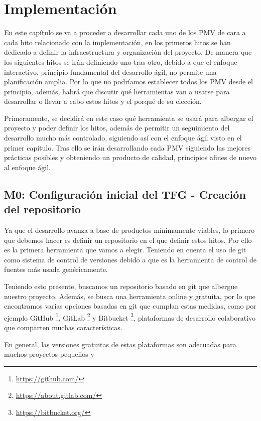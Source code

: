 \chapter{Implementación}

En este capítulo se va a proceder a desarrollar cada uno de los PMV de cara a cada hito relacionado con 
la implementación, en los primeros hitos se han dedicado a definir la infraestructura y organización del 
proyecto. De manera que los siguientes hitos se irán definiendo uno tras otro, debido a que el enfoque 
interactivo, principio fundamental del desarrollo ágil, no permite una planificación amplia. Por lo que no 
podríamos establecer todos los PMV desde el principio, además, habrá que discutir qué herramientas van a usarse 
para desarrollar o llevar a cabo estos hitos y el porqué de su elección. 

Primeramente, se decidirá en este caso qué herramienta se usará para albergar el proyecto y poder definir los 
hitos, además de permitir un seguimiento del desarrollo mucho más controlado, siguiendo así con el enfoque ágil 
visto en el primer capítulo. Tras ello se irán desarrollando cada PMV siguiendo las mejores prácticas posibles y 
obteniendo un producto de calidad, principios afines de nuevo al enfoque ágil.



\section{M0: Configuración inicial del TFG - Creación del repositorio}


Ya que el desarrollo avanza a base de productos mínimamente viables, lo primero que 
debemos hacer es definir un repositorio en el que definir estos hitos. Por ello es la primera herramienta
que vamos a elegir. Teniendo en cuenta el uso de git como sistema de control de versiones debido a que es 
la herramienta de control de fuentes más usada genéricamente. 

Teniendo esto presente, buscamos un repositorio basado en git que albergue nuestro proyecto. Además, se busca
una herramienta online y gratuita, por lo que encontramos varias opciones basadas en git que cumplan estas
medidas, como por ejemplo GitHub \footnote{\url{https://github.com/}}, GitLab
\footnote{\url{https://about.gitlab.com/}} y Bitbucket \footnote{\url{https://bitbucket.org/}}, 
plataformas de desarrollo colaborativo que comparten muchas características. 


En general, las versiones gratuitas de estas plataformas son adecuadas para muchos proyectos pequeños y

